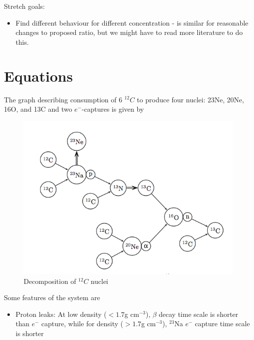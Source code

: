 \documentclass[11pt]{article}
\begin{document}
	Stretch goals:	
	\begin{itemize}
		\item Find different behaviour for different concentration - is similar for reasonable changes to proposed ratio, but we might have to read more literature to do this.
	\end{itemize}

\section{Equations}
The graph describing consumption of 6 $^{12}C$ to produce four nuclei: 23Ne, 20Ne, 16O, and 13C and two $e^-$-captures is given by
	\begin{figure}[h]
		\centering
		\includegraphics{resources/graph}
		\caption{Decomposition of $^{12}C$ nuclei}
	\end{figure}
	
	Some features of the system are
	\begin{itemize}
		\item Proton leaks: At low density ($<1.7$g cm$^{-3}$), $\beta$ decay time scale is shorter than $e^-$ capture, while for density ($>1.7$g cm$^{-3}$), $^{23}$Na $e^{-}$ capture time scale is shorter 
	\end{itemize}
	 
\end{document}
